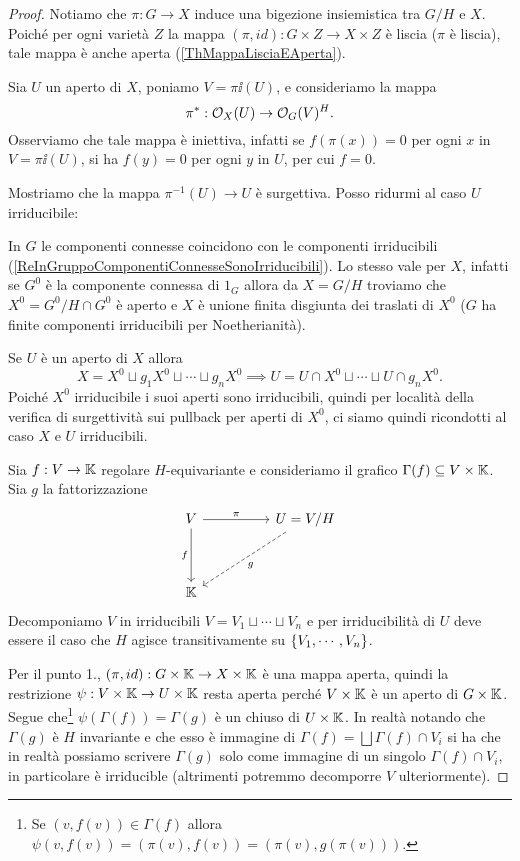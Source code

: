 \begin{proof}
Notiamo che $\pi\colon G \to X$ induce una bigezione insiemistica tra $G/H$ e $X$. Poiché per ogni varietà $Z$ la mappa $(\pi,id)\colon G\times Z \to X\times Z$ è liscia ($\pi$ è liscia), tale mappa è anche aperta (\ref{ThMappaLisciaEAperta}).

Sia $U$ un aperto di $X$, poniamo $V=\pi\ii(U)$, e consideriamo la mappa
\[\pi^\ast:\mathcal{O}_X(U)\to \mathcal{O}_G(V)^H.\]
Osserviamo che tale mappa è iniettiva, infatti se $f(\pi(x))=0$ per ogni $x$ in $V=\pi\ii (U)$, si ha $f(y)=0$ per ogni $y$ in $U$, per cui $f=0$. 

Mostriamo che la mappa $\pi^{-1}(U)\to U$ è surgettiva.
Posso ridurmi al caso $U$ irriducibile:

In $G$ le componenti connesse coincidono con le componenti irriducibili (\ref{ReInGruppoComponentiConnesseSonoIrriducibili}). Lo stesso vale per $X$, infatti se $G^0$ \`e la componente connessa di $1_G$ allora da $X=G/H$ troviamo che $X^0=G^0/H\cap G^0$ \`e aperto e $X$ \`e unione finita disgiunta dei traslati di $X^0$ ($G$ ha finite componenti irriducibili per Noetherianit\`a).

Se $U$ \`e un aperto di $X$ allora 
\[X=X^0\sqcup g_1X^0\sqcup\cdots\sqcup g_nX^0\implies U=U\cap X^0\sqcup \cdots\sqcup U\cap g_n X^0.\]
Poich\'e $X^0$ irriducibile i suoi aperti sono irriducibili, quindi per localit\`a della verifica di surgettivit\`a sui pullback per aperti di $X^0$, ci siamo quindi ricondotti al caso $X$ e $U$ irriducibili.

Sia $f:V\to \mathbb{K}$ regolare $H$-equivariante e consideriamo il grafico $\Gamma(f)\subseteq V\times \mathbb{K}$. Sia $g$ la fattorizzazione 
\[\begin{tikzcd}
	V && {U=V/H} \\
	\\
	\K
	\arrow["\pi", from=1-1, to=1-3]
	\arrow["f"', from=1-1, to=3-1]
	\arrow["g", dashed, from=1-3, to=3-1]
\end{tikzcd}\]
Decomponiamo $V$ in irriducibili $V=V_1\sqcup\cdots\sqcup V_n$ e per irriducibilit\`a di $U$ deve essere il caso che $H$ agisce transitivamente su $\left\{{V_1,\cdots, V_n}\right\}$.

Per il punto 1., $(\pi,id):G\times \mathbb{K}\to X\times\mathbb{K}$ \`e una mappa aperta, quindi la restrizione $\psi:V\times \mathbb{K}\to U\times \mathbb{K}$ resta aperta perch\'e $V\times \mathbb{K}$ \`e un aperto di $G\times \mathbb{K}$. Segue che\footnote{Se $(v,f(v))\in\Gamma(f)$ allora $\psi(v,f(v))=(\pi(v),f(v))=(\pi(v),g(\pi(v)))$.} $\psi(\Gamma(f))=\Gamma(g)$ \`e un chiuso di $U\times \mathbb{K}$. In realt\`a notando che $\Gamma(g)$ \`e $H$ invariante e che esso \`e immagine di $\Gamma(f)=\bigsqcup \Gamma(f)\cap V_i$ si ha che in realt\`a possiamo scrivere $\Gamma(g)$ solo come immagine di un singolo $\Gamma(f)\cap V_i$, in particolare \`e irriducible (altrimenti potremmo decomporre $V$ ulteriormente).


\end{proof}
